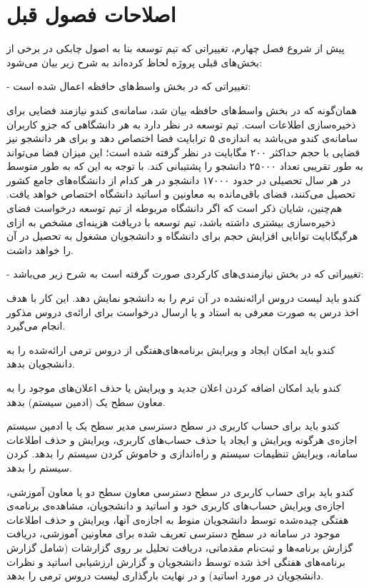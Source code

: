 \documentclass{report}
\begin{document}
\section*{اصلاحات فصول قبل}

پیش از شروع فصل چهارم، تغییراتی که تیم توسعه بنا به اصول چابکی در برخی از بخش‌های قبلی پروژه لحاظ کرده‌اند به شرح زیر بیان می‌شود:

- تغییراتی که در بخش واسط‌های حافظه اعمال شده است:

همان‌گونه که در بخش واسط‌های حافظه بیان شد، سامانه‌ی کندو نیازمند فضایی برای ذخیره‌سازی اطلاعات است. تیم توسعه در نظر دارد به هر دانشگاهی که جزو کاربران سامانه‌ی کندو می‌باشد به اندازه‌ی ۵ ترابایت فضا اختصاص دهد و برای هر دانشجو نیز فضایی با حجم حداکثر ۲۰۰ مگابایت در نظر گرفته شده است؛ این میزان فضا می‌تواند به طور تقریبی تعداد ۲۵۰۰۰ دانشجو را پشتیبانی کند. با توجه به این که به طور متوسط در هر سال تحصیلی در حدود ۱۷۰۰۰ دانشجو در هر کدام از دانشگاه‌های جامع کشور تحصیل می‌کنند، فضای باقی‌مانده به معاونین و اساتید دانشگاه اختصاص خواهد یافت. هم‌چنین، شایان ذکر است که اگر دانشگاه مربوطه از تیم توسعه درخواست فضای ذخیره‌سازی بیشتری داشته باشد، تیم توسعه با دریافت هزینه‌ای مشخص به ازای هرگیگابایت توانایی افزایش حجم برای دانشگاه و دانشجویان مشغول به تحصیل در آن را خواهد داشت.

- تغییراتی که در بخش نیازمندی‌های کارکردی صورت گرفته است به شرح زیر می‌باشد:

کندو باید لیست دروس ارائه‌نشده در آن ترم را به دانشجو نمایش دهد. این کار با هدف اخذ درس به صورت معرفی به استاد و یا ارسال درخواست برای ارائه‌ی دروس مذکور انجام می‌گیرد.

کندو باید امکان ایجاد و ویرایش برنامه‌های‌هفتگی از دروس ترمی ارائه‌شده را به دانشجویان بدهد.

کندو باید امکان اضافه کردن اعلان جدید و ویرایش یا حذف اعلان‌های موجود را به معاون سطح یک (ادمین سیستم) بدهد.

 کندو باید برای حساب کاربری در سطح دسترسی مدیر سطح یک یا ادمین سیستم اجازه‌ی هرگونه ویرایش و ایجاد یا حذف حساب‌های کاربری، ویرایش و حذف اطلاعات سامانه، ویرایش تنظیمات سیستم و راه‌اندازی و خاموش کردن سیستم را بدهد.
کردن سیستم را بدهد.

کندو باید برای حساب کاربری در سطح دسترسی معاون سطح دو یا معاون آموزشی، اجازه‌ی ویرایش حساب‌های کاربری خود و اساتید و دانشجویان، مشاهده‌ی برنامه‌ی هفتگی چیده‌شده توسط دانشجویان منوط به اجازه‌ی آنها، ویرایش و حذف اطلاعات موجود در سامانه در سطح دسترسی تعریف شده برای معاونین آموزشی، دریافت گزارش‌ برنامه‌ها و ثبت‌نام مقدماتی، دریافت تحلیل بر روی گزارشات (شامل گزارش برنامه‌های هفتگی اخذ شده توسط دانشجویان و گزارش ارزشیابی اساتید و نظرات دانشجویان در مورد اساتید) و در نهایت بارگذاری لیست دروس ترمی را بدهد.
\end{document}
